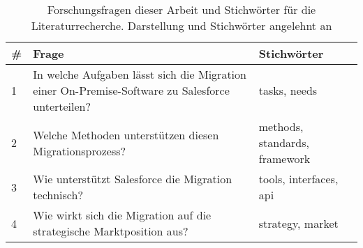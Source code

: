 %
%
\begin{table}[h]
\centering
\begin{tabular}{|l|p{}|p{}|}
	\hline
	\textbf{\#} & \textbf{Frage} & \textbf{Stichwörter} \\
	\hline
	1 & In welche Aufgaben lässt sich die Migration einer 
On-Premise-Software zu Salesforce unterteilen? & tasks, needs \\
	\hline
	2 & Welche Methoden unterstützen diesen 
Migrationsprozess? & methods, standards, framework \\
	\hline
	3 & Wie unterstützt Salesforce die Migration technisch? & tools, 
interfaces, api\\
	\hline
	4 & Wie wirkt sich die Migration auf die strategische Marktposition 
aus? & strategy, market\\
	\hline
\end{tabular}
\caption{Forschungsfragen dieser Arbeit und Stichwörter für die 
Literaturrecherche. Darstellung und Stichwörter angelehnt an 
\cite{exploring_the_factors}
}
\label{tab:forschungsfragen}
\end{table}

